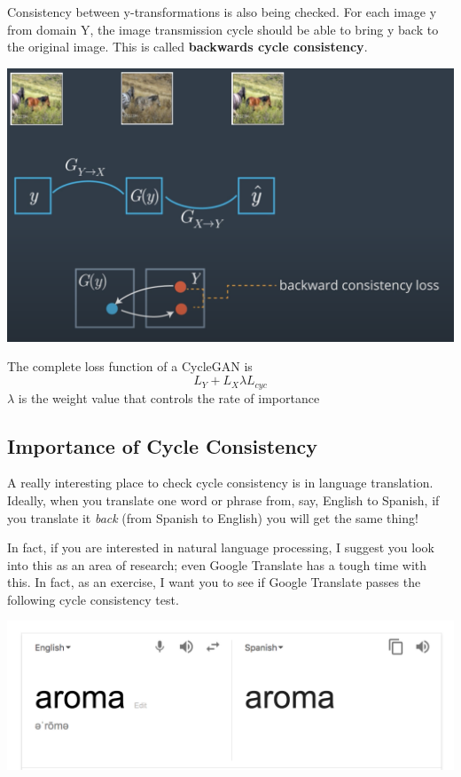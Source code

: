 Consistency between y-transformations is also being checked. For each image y from domain Y, the image transmission cycle should be able to bring y back to the original image. This is called \textbf{backwards cycle consistency}.

\includegraphics[width=1\linewidth]{img//genAdvNet//image2image/backwardConsistencyLoss.png}

The complete loss function of a CycleGAN is \[L_Y + L_X \lambda L_{cyc}\]  \(\lambda\) is the weight value that controls the rate of importance
\subsection{Importance of Cycle Consistency}
A really interesting place to check cycle consistency is in language translation. Ideally, when you translate one word or phrase from, say, English to Spanish, if you translate it \textit{back} (from Spanish to English) you will get the same thing! \newline

In fact, if you are interested in natural language processing, I suggest you look into this as an area of research; even Google Translate has a tough time with this. In fact, as an exercise, I want you to see if Google Translate passes the following cycle consistency test.

\includegraphics[width=0.5\linewidth]{img//genAdvNet//image2image/screen-shot-2018-11-12-at-4.05.54-pm.png}


